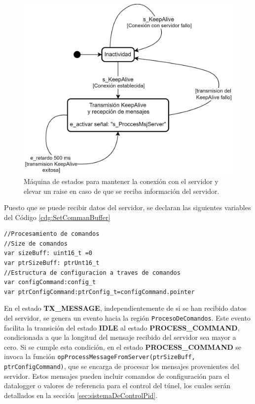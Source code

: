 \begin{figure}[H]
    \centering
    \includegraphics[width=0.7\linewidth]{Figuras/datalogger/Firmware/sc_keepAlive.png}
    \caption{Máquina de estados para mantener la conexión con el servidor y elevar un raise en caso de que se reciba información del servidor.}
    \label{fig:keepAlive}
\end{figure}

Puesto que se puede recibir datos del servidor, se declaran las siguientes variables del Código \ref{cdg:SetCommanBuffer}

\begin{lstlisting}[style=yakindustyle, caption={Declaración de variables para validar y procesar la recepción de datos del servidor.}, label=cdg:SetCommanBuffer,basicstyle=\ttfamily\fontsize{8}{8}\selectfont]
//Procesamiento de comandos
//Size de comandos
var sizeBuff: uint16_t =0
var ptrSizeBuff: ptrUnt16_t
//Estructura de configuracion a traves de comandos
var configCommand:config_t
var ptrConfigCommand:ptrConfig_t=configCommand.pointer
\end{lstlisting}

En el estado \textbf{TX\_MESSAGE}, independientemente de si se han recibido datos del servidor, se genera un evento hacia la región \texttt{ProcesoDeComandos}. Este evento facilita la transición del estado \textbf{IDLE} al estado \textbf{PROCESS\_COMMAND}, condicionada a que la longitud del mensaje recibido del servidor sea mayor a cero. Si se cumple esta condición, en el estado \textbf{PROCESS\_COMMAND} se invoca la función \texttt{opProcessMessageFromServer(ptrSizeBuff, ptrConfigCommand)}, que se encarga de procesar los mensajes provenientes del servidor. Estos mensajes pueden incluir comandos de configuración para el datalogger o valores de referencia para el control del túnel, los cuales serán detallados en la sección \ref{sec:sistemaDeControlPid}.


